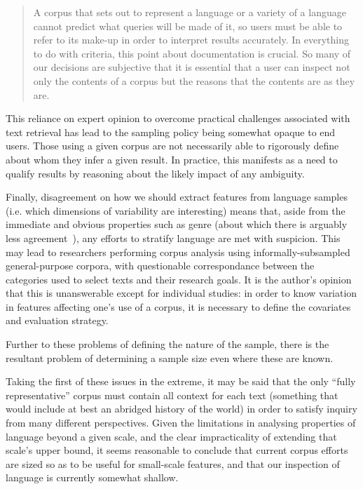 \begin{quote}
A corpus that sets out to represent a language or a variety of a language cannot predict what queries will be made of it, so users must be able to refer to its make-up in order to interpret results accurately. In everything to do with criteria, this point about documentation is crucial. So many of our decisions are subjective that it is essential that a user can inspect not only the contents of a corpus but the reasons that the contents are as they are.
\end{quote}


This reliance on expert opinion to overcome practical challenges associated with text retrieval has lead to the sampling policy being somewhat opaque to end users.
Those using a given corpus are not necessarily able to rigorously define about whom they infer a given result.  In practice, this manifests as a need to qualify results by reasoning about the likely impact of any ambiguity.



Finally, disagreement on how we should extract features from language samples (i.e. which dimensions of variability are interesting) means that, aside from the immediate and obvious properties such as genre (about which there is arguably less agreement~\cite{lee2001genres,aston2001text,sharoffs2015}), any efforts to stratify language are met with suspicion.  This may lead to researchers performing corpus analysis using informally-subsampled general-purpose corpora, with questionable correspondance between the categories used to select texts and their research goals.
It is the author's opinion that this is unanswerable except for individual studies: in order to know variation in features affecting one's use of a corpus, it is necessary to define the covariates and evaluation strategy.



Further to these problems of defining the nature of the sample, there is the resultant problem of determining a sample size even where these are known.  

Taking the first of these issues in the extreme, it may be said that the only ``fully representative'' corpus must contain all context for each text (something that would include at best an abridged history of the world) in order to satisfy inquiry from many different perspectives.  Given the limitations in analysing properties of language beyond a given scale, and the clear impracticality of extending that scale's upper bound, it seems reasonable to conclude that current corpus efforts are sized so as to be useful for small-scale features, and that our inspection of language is currently somewhat shallow.

